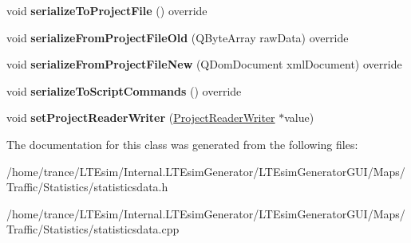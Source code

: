 \begin{DoxyCompactItemize}
\item 
void {\bfseries serialize\+To\+Project\+File} () override\hypertarget{class_statistics_data_a96afd5012f78a4902e271c014bf513a7}{}\label{class_statistics_data_a96afd5012f78a4902e271c014bf513a7}

\item 
void {\bfseries serialize\+From\+Project\+File\+Old} (Q\+Byte\+Array raw\+Data) override\hypertarget{class_statistics_data_ab8228b45e463583aa3ad62b9e58650f6}{}\label{class_statistics_data_ab8228b45e463583aa3ad62b9e58650f6}

\item 
void {\bfseries serialize\+From\+Project\+File\+New} (Q\+Dom\+Document xml\+Document) override\hypertarget{class_statistics_data_a75dce29874b1817fb07870cc3922ad84}{}\label{class_statistics_data_a75dce29874b1817fb07870cc3922ad84}

\item 
void {\bfseries serialize\+To\+Script\+Commands} () override\hypertarget{class_statistics_data_ad1e03dcad059a467b00b839a90f2b2ec}{}\label{class_statistics_data_ad1e03dcad059a467b00b839a90f2b2ec}

\item 
void {\bfseries set\+Project\+Reader\+Writer} (\hyperlink{class_project_reader_writer}{Project\+Reader\+Writer} $\ast$value)\hypertarget{class_statistics_data_ac02af115f10747381363ba75d3a0aad3}{}\label{class_statistics_data_ac02af115f10747381363ba75d3a0aad3}

\end{DoxyCompactItemize}


The documentation for this class was generated from the following files\+:\begin{DoxyCompactItemize}
\item 
/home/trance/\+L\+T\+Esim/\+Internal.\+L\+T\+Esim\+Generator/\+L\+T\+Esim\+Generator\+G\+U\+I/\+Maps/\+Traffic/\+Statistics/statisticsdata.\+h\item 
/home/trance/\+L\+T\+Esim/\+Internal.\+L\+T\+Esim\+Generator/\+L\+T\+Esim\+Generator\+G\+U\+I/\+Maps/\+Traffic/\+Statistics/statisticsdata.\+cpp\end{DoxyCompactItemize}
